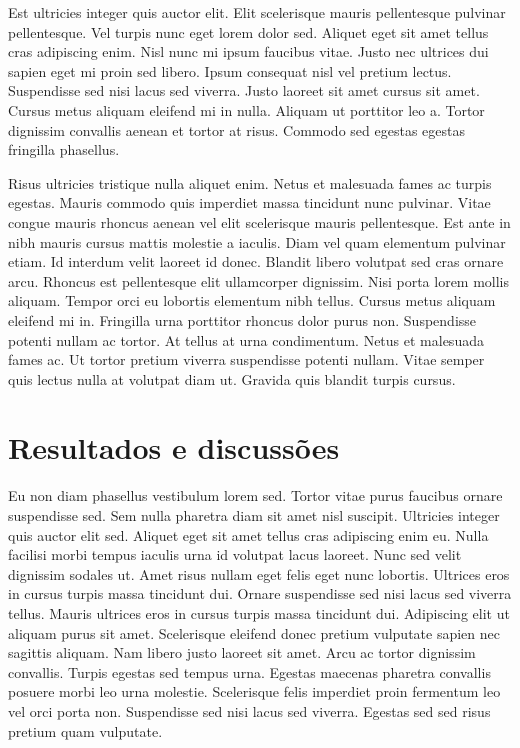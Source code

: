 \documentclass[
  a4paper,
]{report}
\begin{document}
Est ultricies integer quis auctor elit. Elit scelerisque mauris
pellentesque pulvinar pellentesque. Vel turpis nunc eget lorem dolor
sed. Aliquet eget sit amet tellus cras adipiscing enim. Nisl nunc mi
ipsum faucibus vitae. Justo nec ultrices dui sapien eget mi proin sed
libero. Ipsum consequat nisl vel pretium lectus. Suspendisse sed nisi
lacus sed viverra. Justo laoreet sit amet cursus sit amet. Cursus metus
aliquam eleifend mi in nulla. Aliquam ut porttitor leo a. Tortor
dignissim convallis aenean et tortor at risus. Commodo sed egestas
egestas fringilla phasellus.

Risus ultricies tristique nulla aliquet enim. Netus et malesuada fames
ac turpis egestas. Mauris commodo quis imperdiet massa tincidunt nunc
pulvinar. Vitae congue mauris rhoncus aenean vel elit scelerisque mauris
pellentesque. Est ante in nibh mauris cursus mattis molestie a iaculis.
Diam vel quam elementum pulvinar etiam. Id interdum velit laoreet id
donec. Blandit libero volutpat sed cras ornare arcu. Rhoncus est
pellentesque elit ullamcorper dignissim. Nisi porta lorem mollis
aliquam. Tempor orci eu lobortis elementum nibh tellus. Cursus metus
aliquam eleifend mi in. Fringilla urna porttitor rhoncus dolor purus
non. Suspendisse potenti nullam ac tortor. At tellus at urna
condimentum. Netus et malesuada fames ac. Ut tortor pretium viverra
suspendisse potenti nullam. Vitae semper quis lectus nulla at volutpat
diam ut. Gravida quis blandit turpis cursus.

\hypertarget{resultados-e-discussuxf5es}{%
\chapter{Resultados e discussões}\label{resultados-e-discussuxf5es}}

Eu non diam phasellus vestibulum lorem sed. Tortor vitae purus faucibus
ornare suspendisse sed. Sem nulla pharetra diam sit amet nisl suscipit.
Ultricies integer quis auctor elit sed. Aliquet eget sit amet tellus
cras adipiscing enim eu. Nulla facilisi morbi tempus iaculis urna id
volutpat lacus laoreet. Nunc sed velit dignissim sodales ut. Amet risus
nullam eget felis eget nunc lobortis. Ultrices eros in cursus turpis
massa tincidunt dui. Ornare suspendisse sed nisi lacus sed viverra
tellus. Mauris ultrices eros in cursus turpis massa tincidunt dui.
Adipiscing elit ut aliquam purus sit amet. Scelerisque eleifend donec
pretium vulputate sapien nec sagittis aliquam. Nam libero justo laoreet
sit amet. Arcu ac tortor dignissim convallis. Turpis egestas sed tempus
urna. Egestas maecenas pharetra convallis posuere morbi leo urna
molestie. Scelerisque felis imperdiet proin fermentum leo vel orci porta
non. Suspendisse sed nisi lacus sed viverra. Egestas sed sed risus
pretium quam vulputate.
\end{document}
